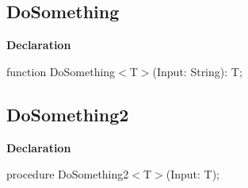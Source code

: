 \documentclass{report}
\newif\ifpdf
\begin{document}
\subsection*{DoSomething}
\fi
\label{ok_generic_routines-DoSomething}
\begin{list}{}{
\setlength{\itemindent}{0cm}
\setlength{\listparindent}{0cm}
\setlength{\leftmargin}{\evensidemargin}
\addtolength{\leftmargin}{\tmplength}
\settowidth{\labelsep}{X}
\addtolength{\leftmargin}{\labelsep}
\setlength{\labelwidth}{\tmplength}
}
\item[\textbf{Declaration}\hfill]
\ifpdf
\begin{flushleft}
\fi
\begin{ttfamily}
function DoSomething{$<$}T{$>$}(Input: String): T;\end{ttfamily}

\ifpdf
\end{flushleft}
\fi

\end{list}
\ifpdf
\subsection*{\large{\textbf{DoSomething2}}\normalsize\hspace{1ex}\hrulefill}
\else
\subsection*{DoSomething2}
\fi
\label{ok_generic_routines-DoSomething2}
\begin{list}{}{
\setlength{\itemindent}{0cm}
\setlength{\listparindent}{0cm}
\setlength{\leftmargin}{\evensidemargin}
\addtolength{\leftmargin}{\tmplength}
\settowidth{\labelsep}{X}
\addtolength{\leftmargin}{\labelsep}
\setlength{\labelwidth}{\tmplength}
}
\item[\textbf{Declaration}\hfill]
\ifpdf
\begin{flushleft}
\fi
\begin{ttfamily}
procedure DoSomething2{$<$}T{$>$}(Input: T);\end{ttfamily}

\ifpdf
\end{flushleft}
\fi

\end{list}
\end{document}
